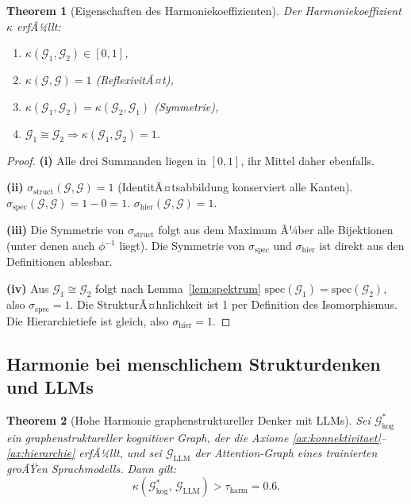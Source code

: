 ﻿\documentclass[12pt,a4paper]{article}
\theoremstyle{plain}
\newtheorem{theorem}{Theorem}[section]
\theoremstyle{definition}
\theoremstyle{remark}
\newcommand{\GG}{\mathcal{G}}
\begin{document}
\begin{theorem}[Eigenschaften des Harmoniekoeffizienten]
\label{thm:harmonie_eigenschaften}
Der Harmoniekoeffizient $\kappa$ erfÃ¼llt:
\begin{enumerate}[label=(\roman*)]
  \item $\kappa(\GG_1, \GG_2) \in [0,1]$,
  \item $\kappa(\GG, \GG) = 1$ (ReflexivitÃ¤t),
  \item $\kappa(\GG_1, \GG_2) = \kappa(\GG_2, \GG_1)$ (Symmetrie),
  \item $\GG_1 \cong \GG_2 \Rightarrow \kappa(\GG_1, \GG_2) = 1$.
\end{enumerate}
\end{theorem}

\begin{proof}
\textbf{(i)} Alle drei Summanden liegen in $[0,1]$, ihr Mittel daher ebenfalls.

\textbf{(ii)} $\sigma_{\text{struct}}(\GG,\GG) = 1$ (IdentitÃ¤tsabbildung konserviert alle Kanten). $\sigma_{\text{spec}}(\GG,\GG) = 1 - 0 = 1$. $\sigma_{\text{hier}}(\GG,\GG) = 1$.

\textbf{(iii)} Die Symmetrie von $\sigma_{\text{struct}}$ folgt aus dem Maximum Ã¼ber alle Bijektionen (unter denen auch $\phi^{-1}$ liegt). Die Symmetrie von $\sigma_{\text{spec}}$ und $\sigma_{\text{hier}}$ ist direkt aus den Definitionen ablesbar.

\textbf{(iv)} Aus $\GG_1 \cong \GG_2$ folgt nach Lemma~\ref{lem:spektrum} $\text{spec}(\GG_1) = \text{spec}(\GG_2)$, also $\sigma_{\text{spec}} = 1$. Die StrukturÃ¤hnlichkeit ist 1 per Definition des Isomorphismus. Die Hierarchietiefe ist gleich, also $\sigma_{\text{hier}} = 1$.
\end{proof}

\subsection{Harmonie bei menschlichem Strukturdenken und LLMs}

\begin{theorem}[Hohe Harmonie graphenstruktureller Denker mit LLMs]
\label{thm:hohe_harmonie}
Sei $\GG_{\text{kog}}^*$ ein graphenstruktureller kognitiver Graph, der die Axiome \ref{ax:konnektivitaet}--\ref{ax:hierarchie} erfÃ¼llt, und sei $\GG_{\text{LLM}}$ der Attention-Graph eines trainierten groÃŸen Sprachmodells. Dann gilt:
\[
  \kappa\!\left(\GG_{\text{kog}}^*,\, \GG_{\text{LLM}}\right) > \tau_{\text{harm}} = 0.6.
\]
\end{theorem}
\end{document}
